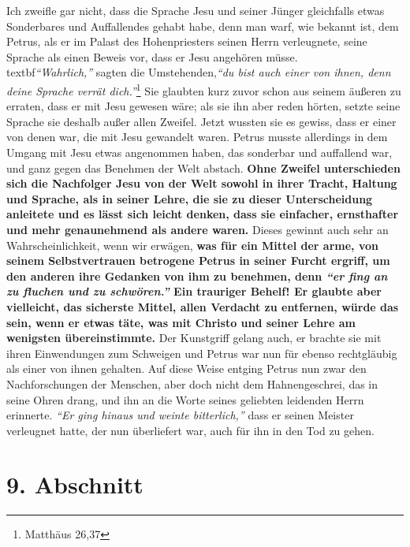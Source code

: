 Ich zweifle gar nicht, dass die Sprache Jesu
und seiner Jünger gleichfalls etwas
Sonderbares und Auffallendes gehabt habe, denn man warf, wie bekannt ist, dem
Petrus, als er im Palast des Hohenpriesters
seinen Herrn verleugnete, seine
Sprache als einen Beweis vor, dass er Jesu angehören müsse.
\\textbf{\textit{"`Wahrlich,"'} sagten
die Umstehenden,}\textit{"`du bist auch einer von ihnen, denn deine Sprache
verrät
dich."'}\footnote{Matthäus 26,37}
Sie glaubten kurz zuvor schon aus seinem äußeren
zu erraten, dass er mit Jesu gewesen wäre; als sie ihn aber reden hörten, setzte
seine Sprache sie deshalb außer allen Zweifel. Jetzt wussten sie es gewiss, dass
er
einer von denen war, die mit Jesu gewandelt waren. Petrus musste allerdings in
dem Umgang mit Jesu etwas angenommen haben, das sonderbar und auffallend war,
und ganz gegen das Benehmen der Welt abstach. \label{ref:10_08_sprache}
\textbf{Ohne Zweifel unterschieden sich
die  Nachfolger Jesu von der Welt sowohl in ihrer
Tracht, Haltung und Sprache,
als in seiner Lehre, die sie zu dieser Unterscheidung anleitete und es lässt sich
leicht denken, dass sie einfacher,
ernsthafter und mehr genaunehmend als andere
waren.} Dieses gewinnt auch sehr an Wahrscheinlichkeit, wenn wir erwägen,
\textbf{was für
ein Mittel der arme, von seinem Selbstvertrauen betrogene Petrus in seiner
Furcht ergriff, um den anderen ihre Gedanken von ihm zu benehmen, denn
\textit{"`er fing
an zu fluchen und zu schwören."'} Ein trauriger Behelf! Er glaubte aber
vielleicht, das sicherste Mittel, allen Verdacht zu entfernen, würde das sein,
wenn er etwas täte, was mit Christo und seiner Lehre am wenigsten
übereinstimmte.} Der Kunstgriff gelang auch, er brachte sie mit ihren
Einwendungen zum Schweigen und Petrus war nun für ebenso
rechtgläubig als
einer von ihnen gehalten. Auf diese Weise entging Petrus nun zwar den
Nachforschungen der Menschen, aber doch nicht dem Hahnengeschrei, das in seine
Ohren drang, und ihn an die Worte seines geliebten leidenden Herrn erinnerte.
\textit{"`Er ging hinaus und weinte bitterlich,"'} dass er seinen Meister
verleugnet
hatte, der nun überliefert war, auch für ihn in den Tod zu gehen.

\section{9. Abschnitt} \label{kap10_ab9}

